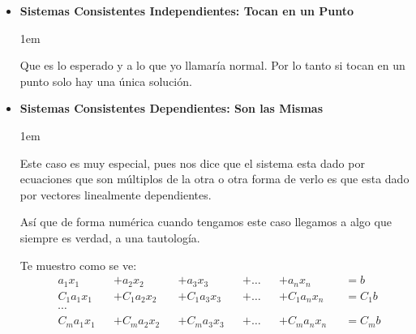 \documentclass[12pt, fleqn]{report}                             %
\newenvironment{SmallIndentation}[1][0.75em]                    %
    {\begin{adjustwidth}{#1}{}\begin{footnotesize}}                 %
    {\end{footnotesize}\end{adjustwidth}}                           %
\begin{document}
                \begin{itemize}

                    \item
                        \textbf{Sistemas Consistentes Independientes: Tocan en un Punto}

                        \begin{SmallIndentation}[1em]
                            Que es lo esperado y a lo que yo llamaría normal.
                            Por lo tanto si tocan en un punto solo hay una única solución.
                        \end{SmallIndentation}


                    \item
                        \textbf{Sistemas Consistentes Dependientes: Son las Mismas}

                        \begin{SmallIndentation}[1em]

                            Este caso es muy especial, pues nos dice que el sistema esta
                            dado por ecuaciones que son múltiplos de la otra o otra forma
                            de verlo es que esta dado por vectores linealmente dependientes.

                            Así que de forma numérica cuando tengamos este caso llegamos a
                            algo que siempre es verdad, a una tautología.

                            Te muestro como se ve:
                            \begin{equation*}
                            \begin{split}
                                &a_1x_1    &&+ a_2x_2    &&+ a_3x_3    &&+ \dots &&+ a_nx_n    &&= b    \\
                                &C_1a_1x_1 &&+ C_1a_2x_2 &&+ C_1a_3x_3 &&+ \dots &&+ C_1a_nx_n &&= C_1b \\
                                &\cdots                                                                 \\
                                &C_ma_1x_1 &&+ C_ma_2x_2 &&+ C_ma_3x_3 &&+ \dots &&+ C_ma_nx_n &&= C_mb \\
                            \end{split}
                            \end{equation*}


\end{SmallIndentation}
\end{itemize}
\end{document}
